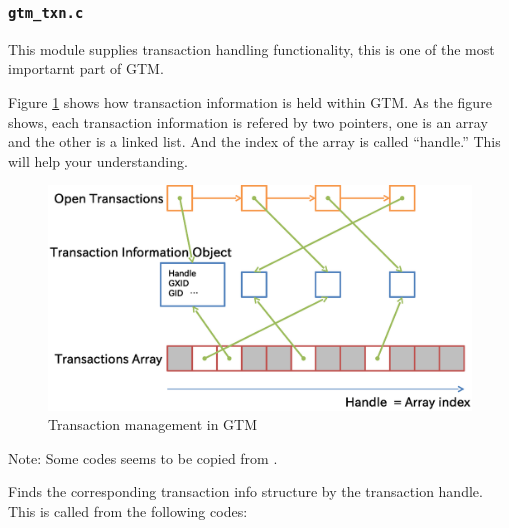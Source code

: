 
\subsubsection{\texttt{gtm\_txn.c}}

  This module supplies transaction handling functionality, this is one of the most importarnt
  part of GTM.
  
  Figure \ref{fig:addgtmtxn} shows how transaction information is held within GTM.
  As the figure shows, each transaction information is refered by two pointers, one is an
  array and the other is a linked list.
  And the index of the array is called ``handle.''
  This will help your understanding.
  
  \begin{figure}[htp]
	  \begin{center}
		  \includegraphics[width=0.8\hsize]{add_gtmtxn.eps}
		  \caption{\label{fig:addgtmtxn}Transaction management in GTM}
	  \end{center}
  \end{figure}
  
  Note: Some codes seems to be copied from .
  
  
  
    Finds the corresponding transaction info structure by the transaction handle.
    This is called from the following codes:
    
    \FuncRefHdr
		\\
		\\ \hline
    \FuncRefTrailor
  

